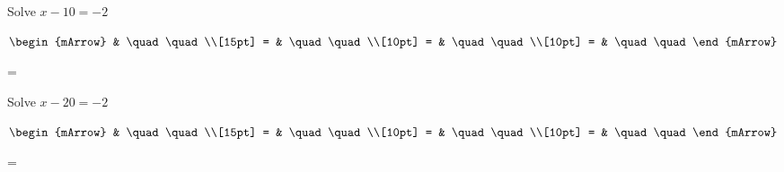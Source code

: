 \begin{mtask}[resume]
   \task \begin{exercise} Solve $ x - 10 = -2 $
           \begin{envSolution}
             $\begin{mArrow} 
			       & \quad \quad              \\[15pt]
                 = & \quad \quad              \\[10pt]
		   		 = & \quad \quad              \\[10pt]
				 = & \quad \quad 
              \end{mArrow}$
            \begin{shortsolution}  
			     =$ \quad \quad \quad \quad$
			\end{shortsolution}				 
           \end{envSolution}
         \end{exercise}
   \task \begin{exercise} Solve $ x - 20 = -2 $
           \begin{envSolution}
             $\begin{mArrow} 
			       & \quad \quad              \\[15pt]
                 = & \quad \quad              \\[10pt]
		   		 = & \quad \quad              \\[10pt]
				 = & \quad \quad 
              \end{mArrow}$
            \begin{shortsolution}  
			     =$ \quad \quad \quad \quad$
			\end{shortsolution}				 
           \end{envSolution}
         \end{exercise}
\end{mtask}

